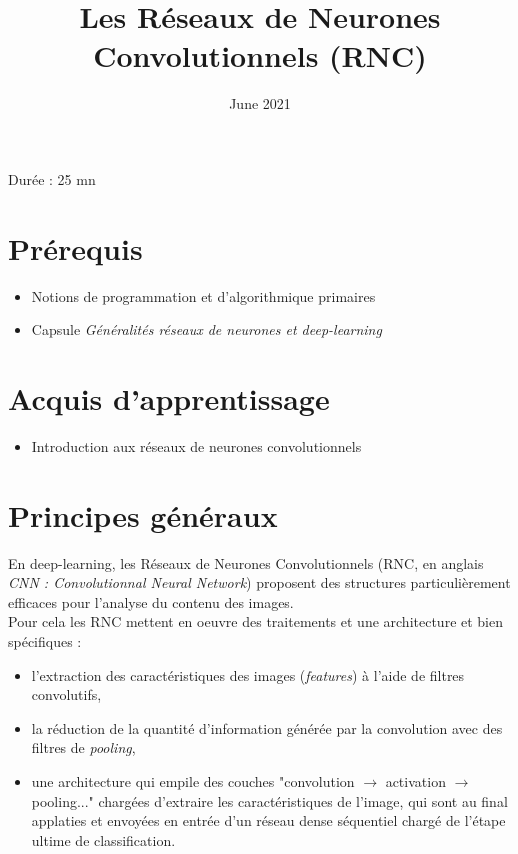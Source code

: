 \documentclass{article}
\title{Les Réseaux de Neurones Convolutionnels (RNC)}
\date{June 2021}
\begin{document}
\maketitle



Durée : 25 mn

\section{Prérequis}

\begin{itemize}
\item Notions de programmation et d'algorithmique primaires
\item Capsule \textit{Généralités réseaux de neurones et deep-learning}
\end{itemize}


\section{Acquis d'apprentissage}

\begin{itemize}
\item Introduction aux réseaux de neurones convolutionnels
\end{itemize}


\section{Principes généraux}


En deep-learning, les Réseaux de Neurones Convolutionnels (RNC, en anglais \textit{CNN : Convolutionnal Neural Network}) 
proposent des structures particulièrement efficaces pour l'analyse du contenu des images. 
\\
Pour cela les RNC mettent en oeuvre des traitements et une architecture et bien spécifiques :
\begin{itemize}
\item l'extraction des caractéristiques des images (\textit{features}) à l'aide de filtres convolutifs,
\item la réduction de la quantité d'information générée par la convolution avec des filtres de \textit{pooling},
\item une architecture qui empile des couches "convolution $\rightarrow$ activation $\rightarrow$ pooling..." chargées d'extraire les caractéristiques
de l'image, qui sont au final applaties et envoyées en entrée d'un réseau dense séquentiel 
chargé de l'étape ultime de classification.
\end{itemize}
\end{document}
